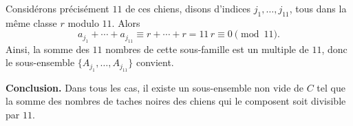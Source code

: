 Considérons précisément $11$ de ces chiens, disons d’indices $j_1,\dots,j_{11}$, tous dans la même classe $r$ modulo $11$. Alors
\[
a_{j_1}+\cdots+a_{j_{11}} \equiv r+\cdots+r = 11\,r \equiv 0 \pmod{11}.
\]
Ainsi, la somme des $11$ nombres de cette sous-famille est un multiple de $11$, donc le sous-ensemble $\{A_{j_1},\dots,A_{j_{11}}\}$ convient.

\medskip
\textbf{Conclusion.} Dans tous les cas, il existe un sous-ensemble non vide de $C$ tel que la somme des nombres de taches noires des chiens qui le composent soit divisible par $11$.



